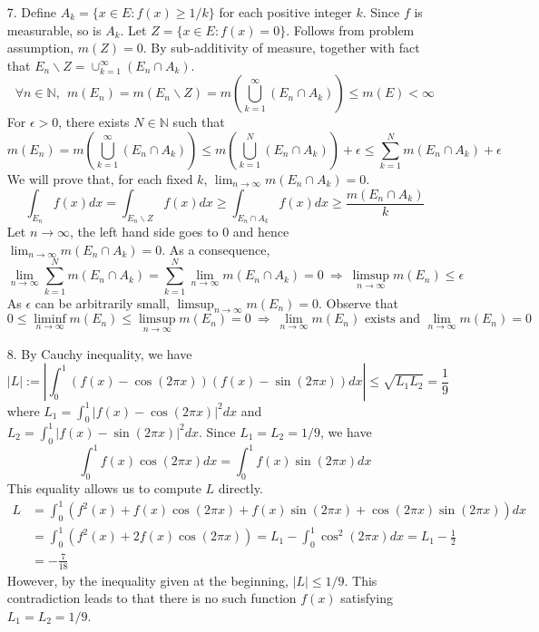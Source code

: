 \begin{itemize}
	\item[7.] Define $A_k = \{x\in E: f(x)\ge 1/k \}$ for each positive integer $k$. Since $f$ is measurable, so is $A_k$. Let $Z=\{x\in E: f(x)=0\}$. Follows from problem assumption, $m(Z)=0$. By sub-additivity of measure, together with fact that $E_n\backslash Z=\cup_{k=1}^\infty (E_n\cap A_k)$.
	$$
	\forall n\in\mathbb{N},~~m\left(E_n\right) = m\left(E_n\backslash Z\right) = m\left(\bigcup_{k=1}^\infty (E_n\cap A_k)\right)\le m(E) < \infty
	$$
	For $\epsilon >0$, there exists $N\in \mathbb{N}$ such that $$
	m(E_n)= m\left(\bigcup_{k=1}^\infty (E_n\cap A_k)\right) \le m\left(\bigcup_{k=1}^N (E_n\cap A_k)\right) + \epsilon\le \sum_{k=1}^N m(E_n\cap A_k) +\epsilon
	$$
	We will prove that, for each fixed $k$, $\lim_{n\rightarrow\infty} m(E_n\cap A_k)=0$.
	$$
	\int_{E_n} f(x)dx = \int_{E_n\backslash Z} f(x)dx\ge \int_{E_n\cap A_k}f(x)dx \ge \frac{m(E_n\cap A_k)}{k}
	$$
	Let $n\rightarrow \infty$, the left hand side goes to $0$ and hence $\lim_{n\rightarrow\infty} m(E_n\cap A_k)=0$. As a consequence,
	$$
	\lim_{n\rightarrow\infty} \sum_{k=1}^N m(E_n\cap A_k) = \sum_{k=1}^N \lim_{n\rightarrow\infty} m(E_n\cap A_k) = 0 ~\Rightarrow~ \limsup_{n\rightarrow\infty} m(E_n) \le \epsilon
	$$
	As $\epsilon$ can be arbitrarily small, $\limsup_{n\rightarrow\infty} m(E_n) = 0$. Observe that
	$$
	0\le \liminf_{n\rightarrow \infty}m(E_n) \le \limsup_{n\rightarrow \infty} m(E_n) =0 ~\Rightarrow~ \lim_{n\rightarrow\infty} m(E_n)\text{ exists and } \lim_{n\rightarrow\infty} m(E_n)=0
	$$
	\item[8.] By Cauchy inequality, we have
	$$
	\left\lvert L \right\rvert := \left\lvert\int_{0}^1  \left(f(x) -\cos(2\pi x)\right)\left(f(x) -\sin(2\pi x)\right) dx \right\rvert \le \sqrt{L_1L_2} = \frac{1}{9}
	$$
	where $L_1 =  \int_{0}^1\left\lvert f(x) -\cos(2\pi x) \right\rvert^2 dx $ and $L_2 =\int_{0}^1\left\lvert f(x) -\sin(2\pi x) \right\rvert^2 dx $. Since $L_1 = L_2 = 1/9$, we have
	$$
	\int_{0}^1 f(x)\cos(2\pi x) dx = \int_{0}^1 f(x)\sin(2\pi x) dx 
	$$
	This equality allows us to compute $L$ directly.
	$$
	\begin{aligned}
	L &= \int_{0}^1 \left( f^2(x)+f(x)\cos(2\pi x) +f(x)\sin(2\pi x)+ \cos(2\pi x)\sin(2\pi x) \right) dx\\
	&= \int_{0}^1\left(f^2(x) + 2f(x)\cos(2\pi x)\right) = L_1 - \int_{0}^1 \cos^2(2\pi x)dx = L_1 - \frac{1}{2}\\
	&= -\frac{7}{18}
	\end{aligned}
	$$
	However, by the inequality given at the beginning, $\lvert L\rvert \le 1/9$. This contradiction leads to that there is no such function $f(x)$ satisfying $L_1=L_2 = 1/9$.
	

\end{itemize}
